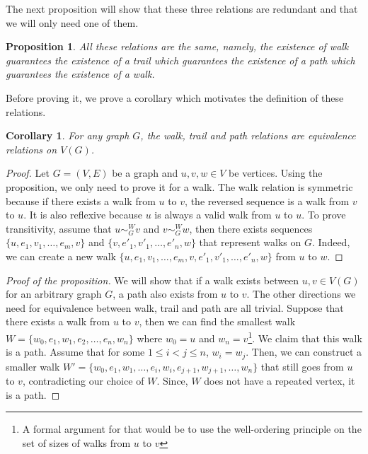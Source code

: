 \documentclass{tufte-handout}
\newtheorem{cor}[thm]{Corollary}
\newtheorem{prop}[thm]{Proposition}
\theoremstyle{definition}
\theoremstyle{remark}
\begin{document}
The next proposition will show that these three relations are redundant and that we will only need one of them.
\begin{prop}
	All these relations are the same, namely, the existence of walk guarantees the existence of a trail which guarantees the existence of a path which guarantees the existence of a walk.
\end{prop}
Before proving it, we prove a corollary which motivates the definition of these relations.
\begin{cor}
	For any graph $G$, the walk, trail and path relations are equivalence relations on $V(G)$.
\end{cor}
\begin{proof}
	Let $G = (V,E)$ be a graph and $u,v,w \in V$ be vertices. Using the proposition, we only need to prove it for a walk. The walk relation is symmetric because if there exists a walk from $u$ to $v$, the reversed sequence is a walk from $v$ to $u$. It is also reflexive because ${u}$ is always a valid walk from $u$ to $u$. To prove transitivity, assume that $u \sim_G^W v$ and $v \sim_G^W w$, then there exists sequences $\{u, e_1, v_1, \dots, e_m, v\}$ and $\{v, e'_1, v'_1, \dots, e'_n, w\}$ that represent walks on $G$. Indeed, we can create a new walk $\{u, e_1, v_1, \dots, e_m, v, e'_1, v'_1, \dots, e'_n, w\}$ from $u$ to $w$.
\end{proof}
\begin{proof}[Proof of the proposition]
	We will show that if a walk exists between $u,v \in V(G)$ for an arbitrary graph $G$, a path also exists from $u$ to $v$. The other directions we need for equivalence between walk, trail and path are all trivial. Suppose that there exists a walk from $u$ to $v$, then we can find the smallest walk $W = \{w_0, e_1, w_1, e_2, \dots, e_n, w_n\}$ where $w_0 = u$ and $w_n = v$\footnote{A formal argument for that would be to use the well-ordering principle on the set of sizes of walks from $u$ to $v$}. We claim that this walk is a path. Assume that for some $1 \leq i < j \leq n$, $w_i = w_j$. Then, we can construct a smaller walk $W' = \{w_0, e_1, w_1, \dots, e_i, w_i, e_{j+1}, w_{j+1}, \dots, w_n\}$ that still goes from $u$ to $v$, contradicting our choice of $W$. Since, $W$ does not have a repeated vertex, it is a path.
\end{proof}
\end{document}
